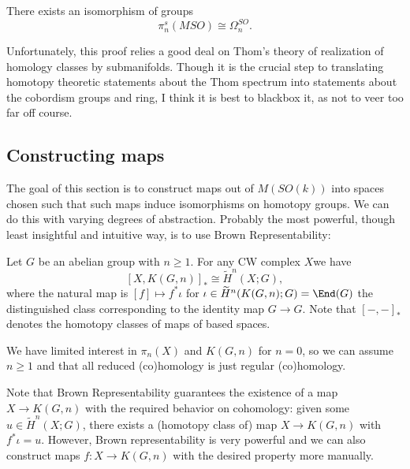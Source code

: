 \begin{theorem}
There exists an isomorphism of groups
    \[\pi_n^s(MSO)\cong\Omega^{SO}_n.\]
\end{theorem}
    Unfortunately, this proof relies a good deal on Thom's theory of realization of homology classes by submanifolds. Though it is the crucial step to translating homotopy theoretic statements about the Thom spectrum into statements about the cobordism groups and ring, I think it is best to blackbox it, as not to veer too far off course.

\subsection{Constructing maps}
The goal of this section is to construct maps out of $M(SO(k))$ into spaces chosen such that such maps induce isomorphisms on homotopy groups. We can do this with varying degrees of abstraction. Probably the most powerful, though least insightful and intuitive way, is to use Brown Representability: 
\begin{theorem}
    Let $G$ be an abelian group with $n\geq 1$. For any CW complex $X$we have
    \[[X,K(G,n)]_*\cong \widetilde H^n(X;G),\]
    where the natural map is $[f]\mapsto f^*\iota$ for $\iota\in \widetilde H^n(K(G,n);G)=\End(G)$ the distinguished class corresponding to the identity map $G\to G$. Note that $[-,-]_*$ denotes the homotopy classes of maps of based spaces.
\end{theorem}
\begin{remark}
    We have limited interest in $\pi_n(X)$ and $K(G,n)$ for $n=0$, so we can assume $n\geq 1$ and that all reduced (co)homology is just regular (co)homology.
\end{remark}

Note that Brown Representability guarantees the existence of a map $X\to K(G,n)$ with the required behavior on cohomology: given some $u\in \widetilde H^n(X;G)$, there exists a (homotopy class of) map $X\to K(G,n)$ with $f^*\iota=u$. However, Brown representability is very powerful and we can also construct maps $f:X\to K(G,n)$ with the desired property more manually. 

